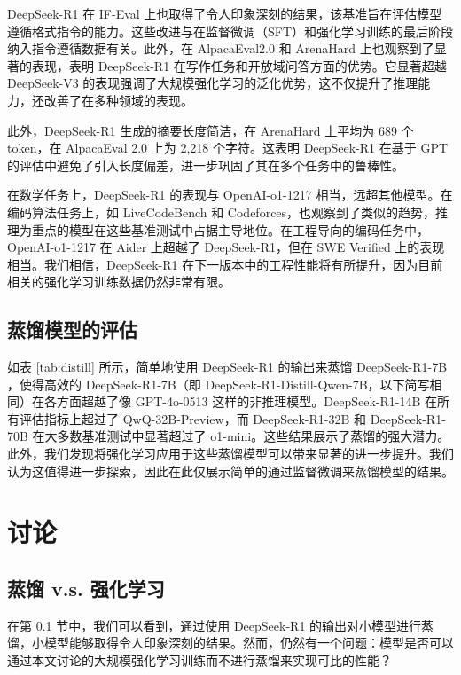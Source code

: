 \documentclass[lang=cn,a4paper,newtx]{elegantpaper}
\newcommand{\dsri}{DeepSeek-R1}
\begin{document}
\dsri{} 在 IF-Eval 上也取得了令人印象深刻的结果，该基准旨在评估模型遵循格式指令的能力。这些改进与在监督微调（SFT）和强化学习训练的最后阶段纳入指令遵循数据有关。此外，在 AlpacaEval2.0 和 ArenaHard 上也观察到了显著的表现，表明 \dsri{} 在写作任务和开放域问答方面的优势。它显著超越 DeepSeek-V3 的表现强调了大规模强化学习的泛化优势，这不仅提升了推理能力，还改善了在多种领域的表现。

此外，\dsri{} 生成的摘要长度简洁，在 ArenaHard 上平均为 689 个 token，在 AlpacaEval 2.0 上为 2,218 个字符。这表明 \dsri{} 在基于 GPT 的评估中避免了引入长度偏差，进一步巩固了其在多个任务中的鲁棒性。

在数学任务上，\dsri{} 的表现与 OpenAI-o1-1217 相当，远超其他模型。在编码算法任务上，如 LiveCodeBench 和 Codeforces，也观察到了类似的趋势，推理为重点的模型在这些基准测试中占据主导地位。在工程导向的编码任务中，OpenAI-o1-1217 在 Aider 上超越了 \dsri{}，但在 SWE Verified 上的表现相当。我们相信，\dsri{} 在下一版本中的工程性能将有所提升，因为目前相关的强化学习训练数据仍然非常有限。

\subsection{蒸馏模型的评估}
\label{sec:distilled_model_evaluation}


如表 \ref{tab:distill} 所示，简单地使用 DeepSeek-R1 的输出来蒸馏 DeepSeek-R1-7B ，使得高效的 DeepSeek-R1-7B（即 DeepSeek-R1-Distill-Qwen-7B，以下简写相同）在各方面超越了像 GPT-4o-0513 这样的非推理模型。DeepSeek-R1-14B 在所有评估指标上超过了 QwQ-32B-Preview，而 DeepSeek-R1-32B 和 DeepSeek-R1-70B 在大多数基准测试中显著超过了 o1-mini。这些结果展示了蒸馏的强大潜力。此外，我们发现将强化学习应用于这些蒸馏模型可以带来显著的进一步提升。我们认为这值得进一步探索，因此在此仅展示简单的通过监督微调来蒸馏模型的结果。

\section{讨论}

\subsection{蒸馏 v.s. 强化学习}



在第 \ref{sec:distilled_model_evaluation} 节中，我们可以看到，通过使用 DeepSeek-R1 的输出对小模型进行蒸馏，小模型能够取得令人印象深刻的结果。然而，仍然有一个问题：模型是否可以通过本文讨论的大规模强化学习训练而不进行蒸馏来实现可比的性能？
\end{document}
